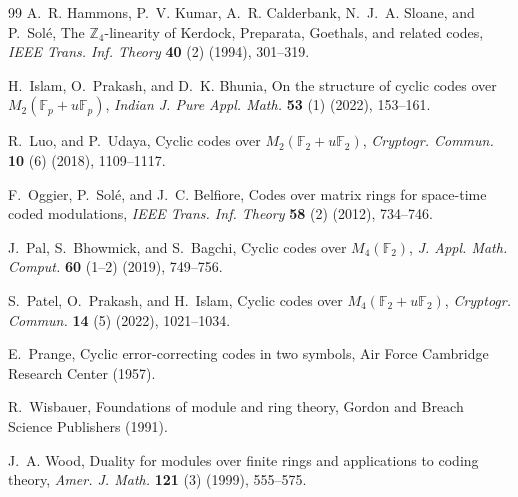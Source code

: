 \documentclass{amsart}
\theoremstyle{definition}
\theoremstyle{remark}
\numberwithin{equation}{section}
\begin{document}
\begin{thebibliography}{99}
A.~R. Hammons, P.~V. Kumar, A.~R. Calderbank, N.~J.~A. Sloane, and P.~Sol\'e,
The $\mathbb{Z}_4$-linearity of Kerdock, Preparata, Goethals, and related codes,
\textit{IEEE Trans. Inf. Theory} \textbf{40} (2) (1994), 301--319.

H.~Islam, O.~Prakash, and D.~K. Bhunia,
On the structure of cyclic codes over $M_2(\mathbb{F}_p+u\mathbb{F}_p)$,
\textit{Indian J. Pure Appl. Math.} \textbf{53} (1) (2022), 153--161.

R.~Luo, and P.~Udaya,
Cyclic codes over $M_2(\mathbb{F}_2+u\mathbb{F}_2)$,
\textit{Cryptogr. Commun.} \textbf{10} (6) (2018), 1109--1117.

F.~Oggier, P.~Sol\'e, and J.~C. Belfiore,
Codes over matrix rings for space-time coded modulations,
\textit{IEEE Trans. Inf. Theory} \textbf{58} (2) (2012), 734--746.

J.~Pal, S.~Bhowmick, and S.~Bagchi,
Cyclic codes over $M_4(\mathbb{F}_2)$,
\textit{J. Appl. Math. Comput.} \textbf{60} (1–2) (2019), 749--756.

S.~Patel, O.~Prakash, and H.~Islam,
Cyclic codes over $M_4(\mathbb{F}_2+u\mathbb{F}_2)$,
\textit{Cryptogr. Commun.} \textbf{14} (5) (2022), 1021--1034.

E.~Prange,
Cyclic error-correcting codes in two symbols,
Air Force Cambridge Research Center (1957).

R.~Wisbauer,
Foundations of module and ring theory,
Gordon and Breach Science Publishers (1991).

J.~A. Wood,
Duality for modules over finite rings and applications to coding theory,
\textit{Amer. J. Math.} \textbf{121} (3) (1999), 555--575.


		
		
\end{thebibliography}
	
\end{document}
